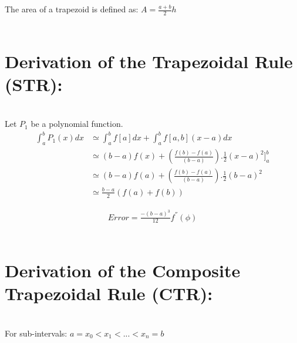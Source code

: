 \documentclass[11pt]{article}
\begin{document}
\begin{page}
\noindent The area of a trapezoid is defined as: $A = \frac{a+b}{2}h$\\
\\

\break

\noindent \chapter{Derivation of the Trapezoidal Rule (STR):}\\
\noindent Let $P_1$ be a polynomial function.\\

\begin{equation}
\begin{aligned}
    \int_{a}^{b} P_1(x) dx &\simeq{} \int_{a}^{b} f[a]dx + \int_{a}^{b} f[a,b](x-a)dx\\
    &\simeq{} (b-a)f(x) + (\frac{f(b)-f(a)}{(b-a)}).\frac{1}{2}(x-a)^{2}]_{a}^{b}\\
    &\simeq{} (b-a)f(a) + (\frac{f(b)-f(a)}{(b-a)}).\frac{1}{2}(b-a)^{2}\\
    &\simeq{} \frac{b-a}{2}(f(a)+f(b))
\end{aligned}
\end{equation}

\begin{equation}
\begin{aligned}
    Error = \frac{-(b-a)^{3}}{12}f^{''}(\phi)
\end{aligned}
\end{equation} 
\\

\noindent \chapter{Derivation of the Composite Trapezoidal Rule (CTR):}\\
\noindent For sub-intervals: $a = x_0 < x_1 < ... < x_n = b$
\\


\end{page}
\end{document}

